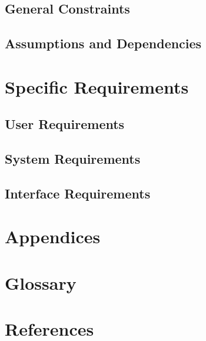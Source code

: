 \documentclass[oneside,12pt]{scrbook}
\begin{document}
\section{General Constraints}
\section{Assumptions and Dependencies}

\chapter{Specific Requirements}
\section{User Requirements}
\section{System Requirements}
\section{Interface Requirements}

\chapter{Appendices}
\chapter{Glossary}
\chapter{References}
\end{document}
